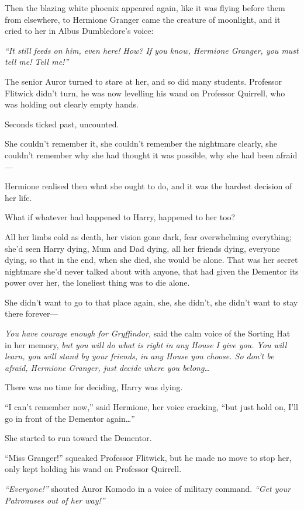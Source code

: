 Then the blazing white phoenix appeared again, like it was flying before
them from elsewhere, to Hermione Granger came the creature of moonlight,
and it cried to her in Albus Dumbledore's voice:

\emph{``It still feeds on him, even here! How? If you know, Hermione
Granger, you must tell me! Tell me!''}

The senior Auror turned to stare at her, and so did many students.
Professor Flitwick didn't turn, he was now levelling his wand on
Professor Quirrell, who was holding out clearly empty hands.

Seconds ticked past, uncounted.

She couldn't remember it, she couldn't remember the nightmare clearly,
she couldn't remember why she had thought it was possible, why she had
been afraid---

Hermione realised then what she ought to do, and it was the hardest
decision of her life.

What if whatever had happened to Harry, happened to her too?

All her limbs cold as death, her vision gone dark, fear overwhelming
everything; she'd seen Harry dying, Mum and Dad dying, all her friends
dying, everyone dying, so that in the end, when she died, she would be
alone. That was her secret nightmare she'd never talked about with
anyone, that had given the Dementor its power over her, the loneliest
thing was to die alone.

She didn't want to go to that place again, she, she didn't, she didn't
want to stay there forever---

\emph{You have courage enough for Gryffindor,} said the calm voice of
the Sorting Hat in her memory, \emph{but you will do what is right in
any House I give you. You will learn, you will stand by your friends, in
any House you choose. So don't be afraid, Hermione Granger, just decide
where you belong\ldots{}}

There was no time for deciding, Harry was dying.

``I can't remember now,'' said Hermione, her voice cracking, ``but just
hold on, I'll go in front of the Dementor again\ldots{}''

She started to run toward the Dementor.

``Miss Granger!'' squeaked Professor Flitwick, but he made no move to
stop her, only kept holding his wand on Professor Quirrell.

\emph{``Everyone!''} shouted Auror Komodo in a voice of military
command. \emph{``Get your Patronuses out of her way!''}

